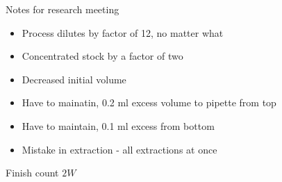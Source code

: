 \documentclass[idxtotoc,hyperref,openany,oneside]{labbook} %
\newcommand{\cmark}{\ding{51}}%
\newcommand{\done}{\rlap{$\square$}{\raisebox{2pt}{\large\hspace{1pt}\cmark}}%
  \hspace{-2.5pt}}
\begin{document}
\begin{todolist}
\begin{itemize}
\begin{enumerate}
    \end{enumerate}
  \end{itemize}
\item[\done]{Notes for research meeting}
  \begin{itemize}
  \item{Process dilutes by factor of 12, no matter what}
  \item{Concentrated stock by a factor of two}
  \item{Decreased initial volume}
  \item{Have to mainatin, 0.2 ml excess volume to pipette from top}
  \item{Have to maintain, 0.1 ml excess from bottom}
  \item{Mistake in extraction - all extractions at once}
  \end{itemize}
\end{todolist}






\begin{todolist}
\item[\done]{Finish count $\boxed{2W}$}
\end{todolist}
\end{document}
